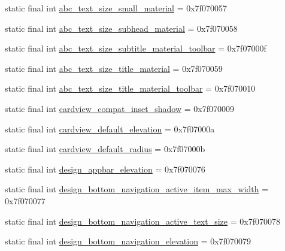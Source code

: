 \begin{CompactItemize}
\item 
static final int \hyperlink{classandroid_1_1support_1_1fragment_1_1_r_1_1dimen_0cb57cef38fe9985b91b245db3e9dc26}{abc\_\-text\_\-size\_\-small\_\-material} = 0x7f070057
\item 
static final int \hyperlink{classandroid_1_1support_1_1fragment_1_1_r_1_1dimen_840f8e1ff84de1d442242ca3f7d17ecb}{abc\_\-text\_\-size\_\-subhead\_\-material} = 0x7f070058
\item 
static final int \hyperlink{classandroid_1_1support_1_1fragment_1_1_r_1_1dimen_1eb86783d228502c71378cbe4a6a4858}{abc\_\-text\_\-size\_\-subtitle\_\-material\_\-toolbar} = 0x7f07000f
\item 
static final int \hyperlink{classandroid_1_1support_1_1fragment_1_1_r_1_1dimen_1198944fbb4462ff9a47a36567620cc5}{abc\_\-text\_\-size\_\-title\_\-material} = 0x7f070059
\item 
static final int \hyperlink{classandroid_1_1support_1_1fragment_1_1_r_1_1dimen_31bd753ca6b8bff2038a9794d94c6871}{abc\_\-text\_\-size\_\-title\_\-material\_\-toolbar} = 0x7f070010
\item 
static final int \hyperlink{classandroid_1_1support_1_1fragment_1_1_r_1_1dimen_b30f8f780d1ec64c87a1d720e408e181}{cardview\_\-compat\_\-inset\_\-shadow} = 0x7f070009
\item 
static final int \hyperlink{classandroid_1_1support_1_1fragment_1_1_r_1_1dimen_b883d99d6033edf0e71f4c393053a7a3}{cardview\_\-default\_\-elevation} = 0x7f07000a
\item 
static final int \hyperlink{classandroid_1_1support_1_1fragment_1_1_r_1_1dimen_3f60d0fbd17c8908f816776507eb9da9}{cardview\_\-default\_\-radius} = 0x7f07000b
\item 
static final int \hyperlink{classandroid_1_1support_1_1fragment_1_1_r_1_1dimen_b76d8a7d40f660e2b59c4960c45cb6e4}{design\_\-appbar\_\-elevation} = 0x7f070076
\item 
static final int \hyperlink{classandroid_1_1support_1_1fragment_1_1_r_1_1dimen_8c4f3934a19455fc73d8d155f094a7b1}{design\_\-bottom\_\-navigation\_\-active\_\-item\_\-max\_\-width} = 0x7f070077
\item 
static final int \hyperlink{classandroid_1_1support_1_1fragment_1_1_r_1_1dimen_8d40228f397568358d8136b5381f663f}{design\_\-bottom\_\-navigation\_\-active\_\-text\_\-size} = 0x7f070078
\item 
static final int \hyperlink{classandroid_1_1support_1_1fragment_1_1_r_1_1dimen_27fb77300608960246542cfa45bff537}{design\_\-bottom\_\-navigation\_\-elevation} = 0x7f070079

\end{CompactItemize}

